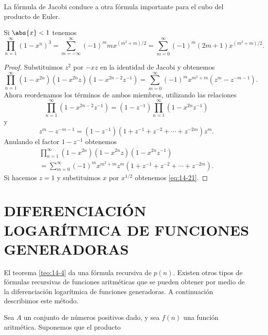     La fórmula de Jacobi conduce a otra fórmula importante para el cubo del producto de Euler.

    \begin{teorema}\label{teo:14-7}
        Si $\abs{x}<1$ tenemos
        \begin{equation}\label{eq:14-21}
            \prod_{n=1}^{\infty}(1-x^n)^3=\sum_{m=-\infty}^{\infty}(-1)^mmx^{(m^2+m)/2}=\sum_{m=0}^{\infty}(-1)^m(2m+1)x^{(m^2+m)/2}.
        \end{equation}
    \end{teorema}

    \begin{proof}
        Substituimos $z^2$ por $-xz$ en la identidad de Jacobi y obtenemos
        \begin{equation*}
            \prod_{n=1}^{\infty}(1-x^{2n})(1-x^{2n}z)(1-x^{2n-2}z^{-1})=\sum_{m=0}^{\infty}(-1)^mx^{m^2+m}\left(z^m-z^{-m-1}\right).
        \end{equation*}
        Ahora reordenamos los términos de ambos miembros, utilizando las relaciones
        \begin{equation*}
            \prod_{n=1}^{\infty}(1-x^{2n-2}z^{-1})=(1-z^{-1})\prod_{n=1}^{\infty}(1-x^{2n}z^{-1})
        \end{equation*}
        y
        \begin{equation*}
            z^m-z^{-m-1}=(1-z^{-1})(1+z^{-1}+z^{-2}+\cdots+z^{-2m})z^m.
        \end{equation*}
        Anulando el factor $1-z^{-1}$ obtenemos
        \begin{multline*}
            \prod_{n=1}^{\infty}(1-x^{2n})(1-x^{2n}z)(1-x^{2n}z^{-1})\\
            =\sum_{m=0}^{\infty}(-1)^mx^{m^2+m}z^m\left(1+z^{-1}+z^{-2}+\cdots+z^{-2m}\right).
        \end{multline*}
        Si hacemos $z=1$ y substituimos $x$ por $x^{1/2}$ obtenemos \eqref{eq:14-21}.
    \end{proof}

    \section{DIFERENCIACIÓN LOGARÍTMICA DE FUNCIONES GENERADORAS}

    El teorema \ref{teo:14-4} da una fórmula recursiva de $p(n)$. Existen otros tipos de
    fórmulas recursivas de funciones aritméticas que se pueden obtener por medio de la
    diferenciación logarítmica de funciones generadoras. A continuación describimos este método.

    Sea $A$ un conjunto de números positivos dado, y sea $f(n)$ una función aritmética.
    Suponemos que el producto


